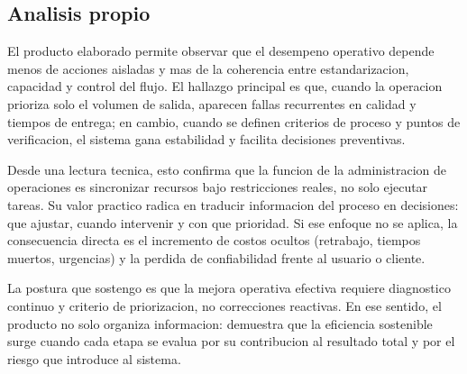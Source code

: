 \documentclass[
	spanish,
	letterpaper, oneside
]{article}
\begin{document}
%

\subsection{Analisis propio}

El producto elaborado permite observar que el desempeno operativo depende menos de acciones aisladas y mas de la coherencia entre estandarizacion, capacidad y control del flujo. El hallazgo principal es que, cuando la operacion prioriza solo el volumen de salida, aparecen fallas recurrentes en calidad y tiempos de entrega; en cambio, cuando se definen criterios de proceso y puntos de verificacion, el sistema gana estabilidad y facilita decisiones preventivas.

Desde una lectura tecnica, esto confirma que la funcion de la administracion de operaciones es sincronizar recursos bajo restricciones reales, no solo ejecutar tareas. Su valor practico radica en traducir informacion del proceso en decisiones: que ajustar, cuando intervenir y con que prioridad. Si ese enfoque no se aplica, la consecuencia directa es el incremento de costos ocultos (retrabajo, tiempos muertos, urgencias) y la perdida de confiabilidad frente al usuario o cliente.

La postura que sostengo es que la mejora operativa efectiva requiere diagnostico continuo y criterio de priorizacion, no correcciones reactivas. En ese sentido, el producto no solo organiza informacion: demuestra que la eficiencia sostenible surge cuando cada etapa se evalua por su contribucion al resultado total y por el riesgo que introduce al sistema.
\end{document}
